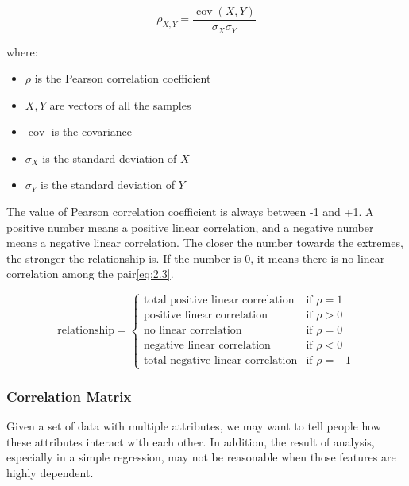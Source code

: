 \documentclass[11pt]{article} %
\theoremstyle{plain}
\theoremstyle{definition}
\begin{document}
{
  \begin{equation}
    \label{eq:2.2}
    \tag{2.2}
    \rho _{X,Y}={\frac {\operatorname {cov} (X,Y)}{\sigma _{X}\sigma _{Y}}}
  \end{equation}

  \footnotesize
  where:
  \begin{itemize}[label=-, leftmargin=4em, itemsep=0.1em]
    \item ${\rho}$ is the Pearson correlation coefficient
    \item ${X, Y}$ are vectors of all the samples
    \item $\operatorname {cov}$ is the covariance
    \item ${\sigma}_{X}$ is the standard deviation of ${X}$
    \item ${\sigma}_{Y}$ is the standard deviation of ${Y}$
  \end{itemize}
}

The value of Pearson correlation coefficient is always between -1 and +1. A positive number means a positive linear correlation, and a negative number means a negative linear correlation. The closer the number towards the extremes, the stronger the relationship is. If the number is 0, it means there is no linear correlation among the pair\eqref{eq:2.3}.

\begin{equation}
  \label{eq:2.3}
  \tag{2.3}
  \text{relationship} = 
  \begin{cases} 
    \text{total positive linear correlation} & \text{if } \rho = 1 \\
    \text{positive linear correlation} & \text{if } \rho > 0 \\
    \text{no linear correlation} & \text{if } \rho = 0 \\
    \text{negative linear correlation} & \text{if } \rho < 0 \\
    \text{total negative linear correlation} & \text{if } \rho = -1
  \end{cases}
\end{equation}

\subsubsection{Correlation Matrix}

Given a set of data with multiple attributes, we may want to tell people how these attributes interact with each other. In addition, the result of analysis, especially in a simple regression, may not be reasonable when those features are highly dependent.
\end{document}
